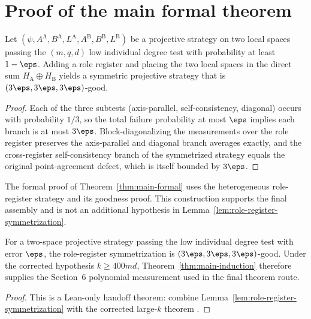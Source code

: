 \section{Proof of the main formal theorem}

\begin{lemma}\label{lem:role-register-symmetrization}
	\leanok
	Let $(\psi,A^{\mathrm A},B^{\mathrm A},L^{\mathrm A},A^{\mathrm B},B^{\mathrm B},L^{\mathrm B})$ be a projective strategy on two local spaces passing the $(m,q,d)$ low individual degree test with probability at least $1-\eps$.  Adding a role register and placing the two local spaces in the direct sum \(H_{\mathrm A}\oplus H_{\mathrm B}\) yields a symmetric projective strategy that is $(3\eps,3\eps,3\eps)$-good.
\end{lemma}
\begin{proof}
	\leanok
	Each of the three subtests (axis-parallel, self-consistency, diagonal) occurs with probability $1/3$, so the total failure probability at most $\eps$ implies each branch is at most $3\eps$. Block-diagonalizing the measurements over the role register preserves the axis-parallel and diagonal branch averages exactly, and the cross-register self-consistency branch of the symmetrized strategy equals the original point-agreement defect, which is itself bounded by $3\eps$.
\end{proof}

\begin{remark}\label{rem:symmetrization-data}
	The formal proof of Theorem~\ref{thm:main-formal} uses the heterogeneous
	role-register strategy and its goodness proof.  This construction supports
	the final assembly and is not an additional hypothesis in
	Lemma~\ref{lem:role-register-symmetrization}.
\end{remark}

	\begin{proposition}\label{lem:main-formal-role-register-handoff}
		\leanok
		For a two-space projective strategy passing the low individual degree test
		with error $\eps$, the role-register symmetrization is
		$(3\eps,3\eps,3\eps)$-good.  Under the corrected hypothesis
		$k\ge400md$, Theorem~\ref{thm:main-induction} therefore supplies the
		Section~6 polynomial measurement used in the final theorem route.
	\end{proposition}
	\begin{proof}
		\leanok
		This is a Lean-only handoff theorem: combine
		Lemma~\ref{lem:role-register-symmetrization} with the corrected
		large-\(k\) theorem .
	\end{proof}

